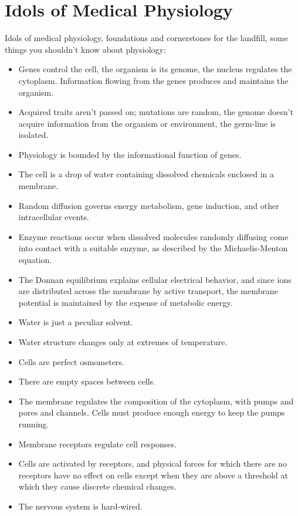\documentclass{article}
\begin{document}
\section*{Idols of Medical Physiology}
Idols of medical physiology, foundations and cornerstones for the landfill, some things you shouldn’t know about physiology:
\begin{itemize}
    \item Genes control the cell, the organism is its genome, the nucleus regulates the cytoplasm. Information flowing from the genes produces and maintains the organism.
    \item Acquired traits aren’t passed on; mutations are random, the genome doesn’t acquire information from the organism or environment, the germ-line is isolated.
    \item Physiology is bounded by the informational function of genes.
    \item The cell is a drop of water containing dissolved chemicals enclosed in a membrane.
    \item Random diffusion governs energy metabolism, gene induction, and other intracellular events.
    \item Enzyme reactions occur when dissolved molecules randomly diffusing come into contact with a suitable enzyme, as described by the Michaelis-Menton equation.
    \item The Donnan equilibrium explains cellular electrical behavior, and since ions are distributed across the membrane by active transport, the membrane potential is maintained by the expense of metabolic energy.
    \item Water is just a peculiar solvent.
    \item Water structure changes only at extremes of temperature.
    \item Cells are perfect osmometers.
    \item There are empty spaces between cells.
    \item The membrane regulates the composition of the cytoplasm, with pumps and pores and channels. Cells must produce enough energy to keep the pumps running.
    \item Membrane receptors regulate cell responses.
    \item Cells are activated by receptors, and physical forces for which there are no receptors have no effect on cells except when they are above a threshold at which they cause discrete chemical changes.
    \item The nervous system is hard-wired.

\end{itemize}
\end{document}

